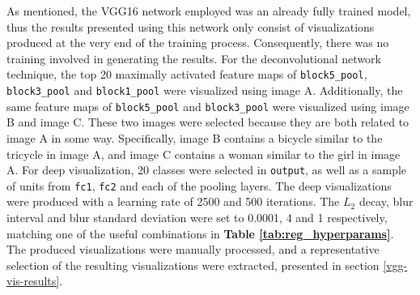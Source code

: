 \noindent As mentioned, the VGG16 network employed was an already fully trained model, thus the results presented using this network only consist of visualizations produced at the very end of the training process. Consequently, there was no training involved in generating the results. For the deconvolutional network technique, the top 20 maximally activated feature maps of \texttt{block5\_pool}, \texttt{block3\_pool} and \texttt{block1\_pool} were visualized using image A. Additionally, the same feature maps of \texttt{block5\_pool} and \texttt{block3\_pool} were visualized using image B and image C. These two images were selected because they are both related to image A in some way. Specifically, image B contains a bicycle similar to the tricycle in image A, and image C contains a woman similar to the girl in image A. For deep visualization, 20 classes were selected in \texttt{output}, as well as a sample of units from \texttt{fc1}, \texttt{fc2} and each of the pooling layers. The deep visualizations were produced with a learning rate of 2500 and 500 iterations. The $L_2$ decay, blur interval and blur standard deviation were set to 0.0001, 4 and 1 respectively, matching one of the useful combinations in \textbf{Table \ref{tab:reg_hyperparams}}. The produced visualizations were manually processed, and a representative selection of the resulting visualizations were extracted, presented in section \ref{vgg-vis-results}.

